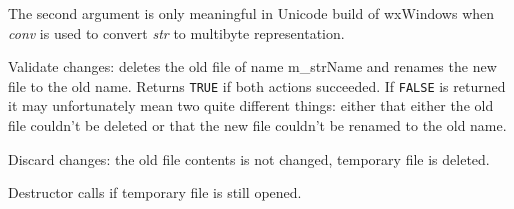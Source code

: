 The second argument is only meaningful in Unicode build of wxWindows when
{\it conv} is used to convert {\it str} to multibyte representation.

\label{wxtempfilecommit}


Validate changes: deletes the old file of name m\_strName and renames the new
file to the old name. Returns {\tt TRUE} if both actions succeeded. If {\tt FALSE} is
returned it may unfortunately mean two quite different things: either that
either the old file couldn't be deleted or that the new file couldn't be renamed
to the old name.

\label{wxtempfilediscard}


Discard changes: the old file contents is not changed, temporary file is
deleted.

\label{wxtempfiledtor}


Destructor calls  if temporary file
is still opened.

